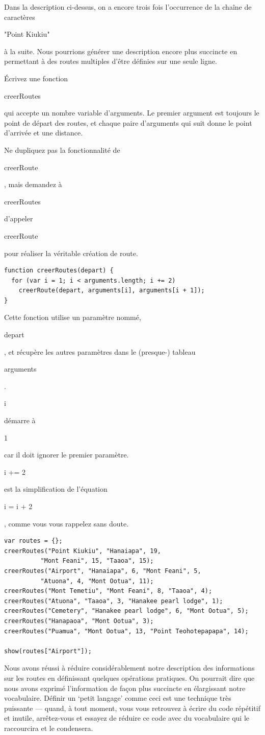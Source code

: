 \documentclass{FramateX}
\renewcommand{\texttt}[1]{\begin{sffamily}{#1}\end{sffamily}}
\begin{document}
Dans la description ci-dessus, on a encore trois fois l'occurrence de la
chaîne de caractères \texttt{"Point Kiukiu"} à la suite. Nous pourrions
générer une description encore plus succincte en permettant à des routes
multiples d'être définies sur une seule ligne.

Écrivez une fonction \texttt{creerRoutes} qui accepte un nombre variable
d'arguments. Le premier argument est toujours le point de départ des
routes, et chaque paire d'arguments qui suit donne le point d'arrivée et
une distance.

Ne dupliquez pas la fonctionnalité de \texttt{creerRoute}, mais demandez
à \texttt{creerRoutes} d'appeler \texttt{creerRoute} pour réaliser la
véritable création de route.

\begin{lstlisting}
function creerRoutes(depart) {
  for (var i = 1; i < arguments.length; i += 2)
    creerRoute(depart, arguments[i], arguments[i + 1]);
}
\end{lstlisting}
Cette fonction utilise un paramètre nommé, \texttt{depart}, et récupère
les autres paramètres dans le (presque-) tableau \texttt{arguments} .
\texttt{i} démarre à \texttt{1} car il doit ignorer le premier
paramètre. \texttt{i += 2} est la simplification de l'équation
\texttt{i = i + 2}, comme vous vous rappelez sans doute.

\begin{lstlisting}
var routes = {};
creerRoutes("Point Kiukiu", "Hanaiapa", 19,
          "Mont Feani", 15, "Taaoa", 15);
creerRoutes("Airport", "Hanaiapa", 6, "Mont Feani", 5,
          "Atuona", 4, "Mont Ootua", 11);
creerRoutes("Mont Temetiu", "Mont Feani", 8, "Taaoa", 4);
creerRoutes("Atuona", "Taaoa", 3, "Hanakee pearl lodge", 1);
creerRoutes("Cemetery", "Hanakee pearl lodge", 6, "Mont Ootua", 5);
creerRoutes("Hanapaoa", "Mont Ootua", 3);
creerRoutes("Puamua", "Mont Ootua", 13, "Point Teohotepapapa", 14);

show(routes["Airport"]);
\end{lstlisting}
\begin{center}\end{center}

Nous avons réussi à réduire considérablement notre description des
informations sur les routes en définissant quelques opérations
pratiques. On pourrait dire que nous avons exprimé l'information de
façon plus succincte en élargissant notre vocabulaire. Définir un `petit
langage' comme ceci est une technique très puissante --- quand, à tout
moment, vous vous retrouvez à écrire du code répétitif et inutile,
arrêtez-vous et essayez de réduire ce code avec du vocabulaire qui le
raccourcira et le condensera.
\end{document}
